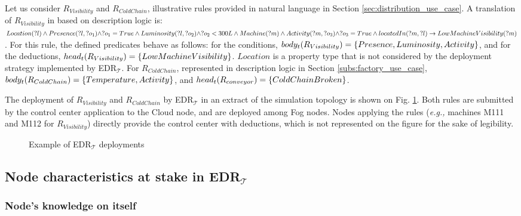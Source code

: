 \documentclass{iosart2c}
\newcommand{\edrt}{EDR$_{\mathcal{T}}$\xspace}
\begin{document}
Let us consider $R_{Visibility}$ and $R_{ColdChain}$, illustrative rules provided in natural language in Section \textsection \ref{sec:distribution_use_case}. 
A translation of $R_{Visibility}$ in based on description logic is: $Lo\-ca\-tion(?l) \land Pre\-sence(?l, ?o_1) \land ?o_1 = True \land Lu\-mi\-no\-si\-ty(?l, ?o_2) \land ?o_2 < 300L \land Ma\-chine(?m) \land Ac\-ti\-vi\-ty(?m, ?o_3) \land ?o_3 = True \land located\-In(?m, ?l) \rightarrow Low\-Machine\-Vi\-si\-bi\-li\-ty(?m)$.
For this rule, the defined predicates behave as follows: for the conditions, $body_t(R_{Visibility})=\{Pre\-sence, Lu\-mi\-no\-si\-ty, Ac\-ti\-vi\-ty\}$, and for the deductions,  $head_t(R_{Visibility})= \{Low\-Ma\-chine\-Vi\-si\-bi\-li\-ty\}$. 
$Location$ is a property type that is not considered by the deployment strategy implemented by \edrt.
For $R_{ColdChain}$, represented in description logic in Section \textsection \ref{subs:factory_use_case}, $body_t(R_{ColdChain})=\{Tem\-pe\-ra\-ture, Ac\-ti\-vi\-ty\}$, and $head_t(R_{conveyor})= \{Cold\-Chain\-Bro\-ken\}$.

The deployment of $R_{Visibility}$ and $R_{ColdChain}$ by \edrt in an extract of the simulation topology is shown on Fig. \ref{fig:edrpt_deployment}.
Both rules are submitted by the control center application to the Cloud node, and are deployed among Fog nodes.
Nodes applying the rules (\textit{e.g.,} machines M111 and M112 for $R_{Visibility}$) directly provide the control center with deductions, which is not represented on the figure for the sake of legibility.

\begin{figure}
	\centering
	\caption{Example of \edrt deployments}
	\label{fig:edrpt_deployment}
	\scalebox{0.8}{
		
	}
\end{figure}

\subsection{Node characteristics at stake in \edrt}
\label{subs:edrt_knowledge}
\subsubsection{Node's knowledge on itself}
\label{subsub:self-knowledge}
\end{document}
